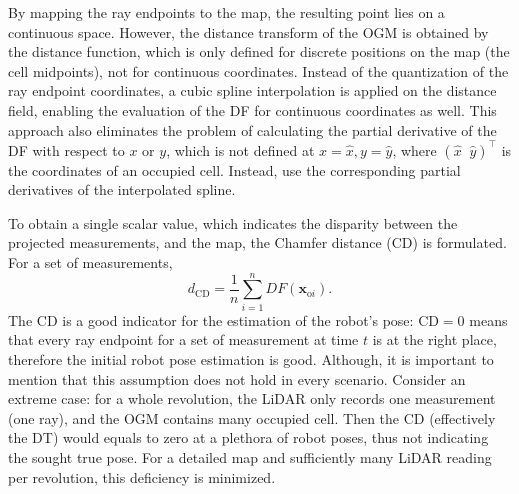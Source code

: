 By mapping the ray endpoints to the map, the resulting point lies
on a continuous space.
However, the distance transform of the OGM is obtained by
the distance function, which is only defined for discrete positions
on the map (the cell midpoints), not for continuous coordinates.
Instead of the quantization of the ray endpoint coordinates, a cubic spline
interpolation is applied on the distance field,
enabling the evaluation of the DF for continuous coordinates as well.
This approach also eliminates the problem of calculating the
partial derivative of the DF with respect to $x$ or $y$,
which is not defined at $x = \hat{x}, y = \hat{y}$, where
$(\hat{x}\;\; \hat{y})^{\top}$ is the coordinates of an occupied cell.
Instead, use the corresponding partial derivatives of the interpolated spline.


To obtain a single scalar value, which indicates the disparity between the projected measurements,
and the map, the Chamfer distance (CD) is formulated. For a set of measurements,
\begin{equation}
    d_{\text{CD}} = \frac{1}{n}\sum_{i=1}^nDF(\mathbf{x}_{\text{o}i}).
\end{equation}
The CD is a good indicator for the estimation of the robot's pose: $\mathrm{CD}=0$ means
that every ray endpoint for a set of measurement at time $t$ is at the right place,
therefore the initial robot pose estimation is good.
Although, it is important to mention that this assumption does not hold in every
scenario. Consider an extreme case: for a whole revolution, the LiDAR only records
one measurement (one ray), and the OGM contains many occupied cell.
Then the CD (effectively the DT) would equals to zero at a plethora of robot poses, thus not indicating the sought true pose.
For a detailed map and sufficiently many LiDAR reading per revolution, this deficiency is minimized.

